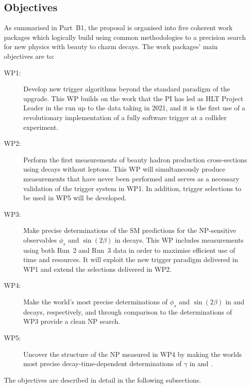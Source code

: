 \documentclass[11pt,a4paper]{article}
\begin{document}
\subsection{Objectives}
As summarised in Part~B1, the proposal is organised into five coherent work packages which logically build using common methodologies to a precision search for new physics with beauty to charm decays. The work packages' main objectives are to: 
\begin{description}
		\item [WP1:] Develop new trigger algorithms beyond the standard paradigm of the \LHCb upgrade. This WP builds on the work that the PI has led as HLT Project Leader in the run up to the data taking in 2021, and it is the first use of a revolutionary implementation of a fully software trigger at a collider experiment.
        \item [WP2:] Perform the first measurements of beauty hadron production cross-sections using decays without leptons. This WP will simultaneously produce measurements that have never been performed and serves as a necessary validation of the trigger system in WP1. In addition, trigger selections to be used in WP5 will be developed. 
        \item [WP3:] Make precise determinations of the SM predictions for the NP-sensitive \CP observables $\phi_s$ and $\sin(2\beta)$ in \HepProcess{\PB\to\PD\PD} decays. This WP includes measurements using both Run~2 and Run~3 data in order to maximise efficient use of time and resources. It will exploit the new trigger paradigm delivered in WP1 and extend the selections delivered in  WP2. 
        \item [WP4:] Make the world's most precise determinations of $\phi_s$ and $\sin(2\beta)$ in \HepProcess{\PBs\to\PDsplus\PDsminus} and \HepProcess{\PBzero\to\PDplus\PDminus} decays, respectively, and through comparison to the determinations of WP3 provide a clean NP search. 
        \item [WP5:] Uncover the structure of the NP measured in WP4 by making the worlds most precise decay-time-dependent determinations of $\gamma$ in \HepProcess{\PBs\to\PDs\PK} and \HepProcess{\PBzero\to\PD\Ppi}. 
        \end{description}
The objectives are described in detail in the following subsections.
\end{document}
